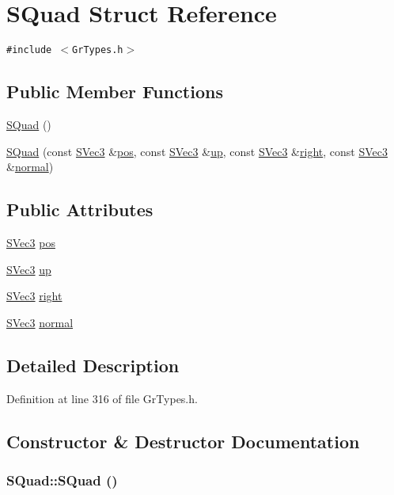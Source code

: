 \hypertarget{struct_s_quad}{
\section{SQuad Struct Reference}
\label{struct_s_quad}
}
{\tt \#include $<$GrTypes.h$>$}

\subsection*{Public Member Functions}
\begin{CompactItemize}
\item 
\hyperlink{struct_s_quad_73a617823073868ca9cef4a9eff6cc7e}{SQuad} ()
\item 
\hyperlink{struct_s_quad_213663863728b94e666265602edf86a2}{SQuad} (const \hyperlink{struct_s_vec3}{SVec3} \&\hyperlink{struct_s_quad_a7639631bb91c54199f9c3d6a6392d9a}{pos}, const \hyperlink{struct_s_vec3}{SVec3} \&\hyperlink{struct_s_quad_dbfd9edef4a3e4465da3b6ba1debd473}{up}, const \hyperlink{struct_s_vec3}{SVec3} \&\hyperlink{struct_s_quad_a7f1aa0ce1dd6db386db3798636e15ea}{right}, const \hyperlink{struct_s_vec3}{SVec3} \&\hyperlink{struct_s_quad_60aeb05592b2d9a7dce3cfeb75eaea1a}{normal})
\end{CompactItemize}
\subsection*{Public Attributes}
\begin{CompactItemize}
\item 
\hyperlink{struct_s_vec3}{SVec3} \hyperlink{struct_s_quad_a7639631bb91c54199f9c3d6a6392d9a}{pos}
\item 
\hyperlink{struct_s_vec3}{SVec3} \hyperlink{struct_s_quad_dbfd9edef4a3e4465da3b6ba1debd473}{up}
\item 
\hyperlink{struct_s_vec3}{SVec3} \hyperlink{struct_s_quad_a7f1aa0ce1dd6db386db3798636e15ea}{right}
\item 
\hyperlink{struct_s_vec3}{SVec3} \hyperlink{struct_s_quad_60aeb05592b2d9a7dce3cfeb75eaea1a}{normal}
\end{CompactItemize}


\subsection{Detailed Description}


Definition at line 316 of file GrTypes.h.

\subsection{Constructor \& Destructor Documentation}
\hypertarget{struct_s_quad_73a617823073868ca9cef4a9eff6cc7e}{
\subsubsection[{SQuad}]{\setlength{\rightskip}{0pt plus 5cm}SQuad::SQuad ()}}
\label{struct_s_quad_73a617823073868ca9cef4a9eff6cc7e}




